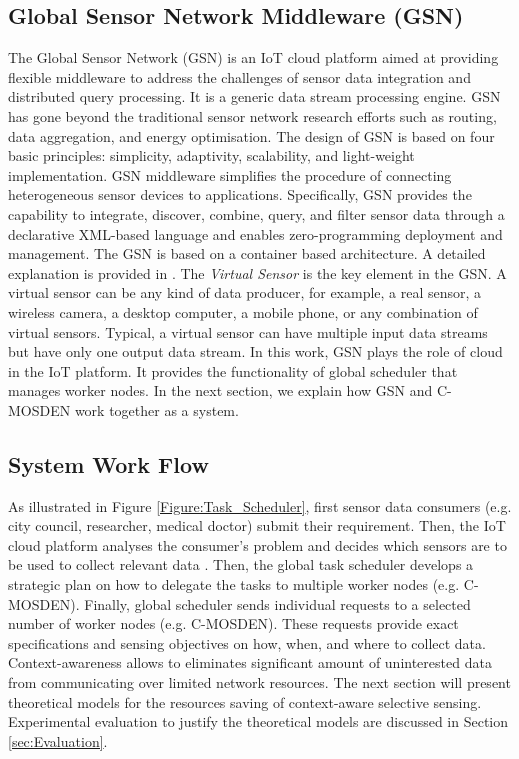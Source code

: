 \documentclass[journal]{IEEEtran}
\begin{document}
\subsection{Global Sensor Network Middleware (GSN)}
The Global Sensor Network (GSN) \cite{P022} is an IoT cloud platform aimed at providing flexible middleware to address the challenges of sensor data integration and distributed query processing. It is a generic data stream processing engine. GSN has gone beyond the traditional sensor network research efforts such as routing, data aggregation, and energy optimisation. The design of GSN is based on four basic principles: simplicity, adaptivity, scalability, and light-weight implementation. GSN middleware simplifies the procedure of connecting heterogeneous sensor devices to applications. Specifically, GSN provides the capability to integrate, discover, combine, query, and filter sensor data through a declarative XML-based language and enables zero-programming deployment and management. The GSN is based on a container based architecture. A detailed explanation is provided in \cite{P022}. The \textit{Virtual Sensor} is the key element in the GSN. A virtual sensor can be any kind of data producer, for example, a real sensor, a wireless camera, a desktop computer, a mobile phone, or any combination of virtual sensors. Typical, a virtual sensor can have multiple input data streams but have only one output data stream.  In this work, GSN plays the   role of cloud in the IoT platform. It provides the functionality of global scheduler that manages worker nodes. In the next section, we explain how GSN and C-MOSDEN work together as a system.



\subsection{System Work Flow}

As illustrated in Figure \ref{Figure:Task_Scheduler}, first sensor data consumers (e.g. city council, researcher, medical doctor) submit their requirement. Then, the IoT cloud platform analyses the consumer's problem and decides which sensors are to be used to collect relevant data \cite{ZMP009}. Then, the global task scheduler develops a strategic plan on how to delegate the tasks to multiple worker nodes (e.g. C-MOSDEN). Finally, global scheduler sends individual requests to a selected number of worker nodes (e.g. C-MOSDEN). These requests provide exact specifications and sensing objectives on  how, when, and where to collect data. Context-awareness allows to eliminates significant amount of uninterested data from communicating over limited network resources. The next section will present theoretical models for the resources saving of context-aware selective sensing. Experimental evaluation to justify the theoretical models are discussed in Section \ref{sec:Evaluation}.
\end{document}
